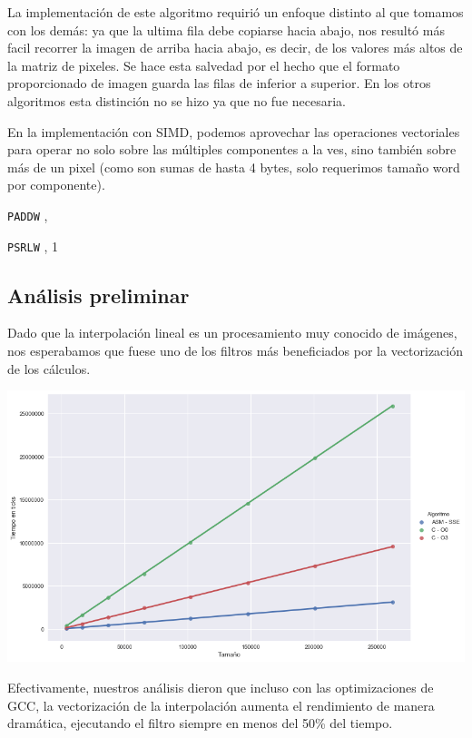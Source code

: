 La implementación de este algoritmo requirió un enfoque distinto al que tomamos con los demás: ya que la ultima fila debe copiarse hacia abajo, nos resultó más facil recorrer la imagen de arriba hacia abajo, es decir, de los valores más altos de la matriz de pixeles. Se hace esta salvedad por el hecho que el formato proporcionado de imagen guarda las filas de inferior a superior. En los otros algoritmos esta distinción no se hizo ya que no fue necesaria.

En la implementación con SIMD, podemos aprovechar las operaciones vectoriales para operar no solo sobre las múltiples componentes a la ves, sino también sobre más de un pixel (como son sumas de hasta 4 bytes, solo requerimos tamaño word por componente).

\begin{center}
   

   

  \texttt{PADDW} ,  \hfill

   

  \texttt{PSRLW} , 1 \hfill

   
\end{center}

\subsection{Análisis preliminar}

Dado que la interpolación lineal es un procesamiento muy conocido de imágenes, nos esperabamos que fuese uno de los filtros más beneficiados por la vectorización de los cálculos.

\begin{center}
  \includegraphics[scale=0.5]{img/linearZoom_CvsASMvsO3.png}
\end{center}

Efectivamente, nuestros análisis dieron que incluso con las optimizaciones de GCC, la vectorización de la interpolación aumenta el rendimiento de manera dramática, ejecutando el filtro siempre en menos del 50\% del tiempo.